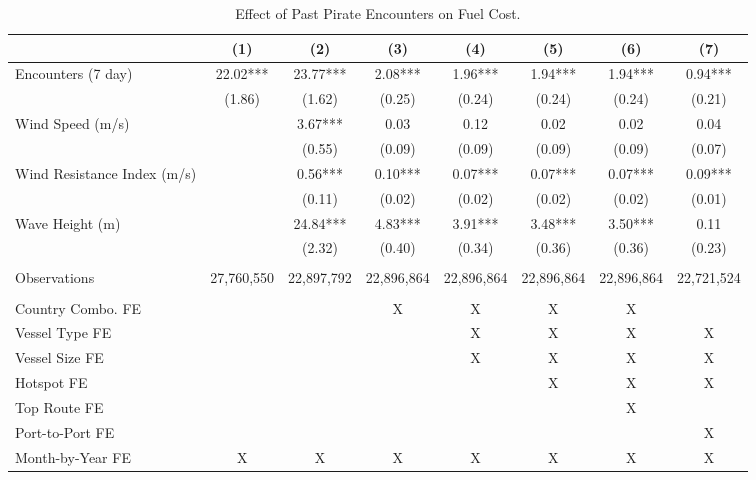 \begin{table}
\centering
\caption{Effect of Past Pirate Encounters on Fuel Cost. \label{tab:spec-fuel-table}}
\centering
\begin{adjustbox}{width = .9\textwidth}
\begin{threeparttable}
\begin{tabular}[t]{lccccccc}
\toprule
  & (1) & (2) & (3) & (4) & (5) & (6) & (7)\\
\midrule
Encounters (7 day) & \num{22.02}*** & \num{23.77}*** & \num{2.08}*** & \num{1.96}*** & \num{1.94}*** & \num{1.94}*** & \num{0.94}***\\
 & (\num{1.86}) & (\num{1.62}) & (\num{0.25}) & (\num{0.24}) & (\num{0.24}) & (\num{0.24}) & (\num{0.21})\\
Wind Speed (m/s) &  & \num{3.67}*** & \num{0.03} & \num{0.12} & \num{0.02} & \num{0.02} & \num{0.04}\\
 &  & (\num{0.55}) & (\num{0.09}) & (\num{0.09}) & (\num{0.09}) & (\num{0.09}) & (\num{0.07})\\
Wind Resistance Index (m/s) &  & \num{0.56}*** & \num{0.10}*** & \num{0.07}*** & \num{0.07}*** & \num{0.07}*** & \num{0.09}***\\
 &  & (\num{0.11}) & (\num{0.02}) & (\num{0.02}) & (\num{0.02}) & (\num{0.02}) & (\num{0.01})\\
Wave Height (m) &  & \num{24.84}*** & \num{4.83}*** & \num{3.91}*** & \num{3.48}*** & \num{3.50}*** & \num{0.11}\\
 &  & (\num{2.32}) & (\num{0.40}) & (\num{0.34}) & (\num{0.36}) & (\num{0.36}) & (\num{0.23})\\
 &  &  &  &  &  &  & \\
Observations & 27,760,550 & 22,897,792 & 22,896,864 & 22,896,864 & 22,896,864 & 22,896,864 & 22,721,524\\
 &  &  &  &  &  &  & \\
Country Combo. FE &  &  & X & X & X & X & \\
Vessel Type FE &  &  &  & X & X & X & X\\
Vessel Size FE &  &  &  & X & X & X & X\\
Hotspot FE &  &  &  &  & X & X & X\\
Top Route FE &  &  &  &  &  & X & \\
Port-to-Port FE &  &  &  &  &  &  & X\\
Month-by-Year FE & X & X & X & X & X & X & X\\
\bottomrule
\end{tabular}
\begin{tablenotes}

\end{tablenotes}
\end{threeparttable}
\end{adjustbox}
\end{table}
